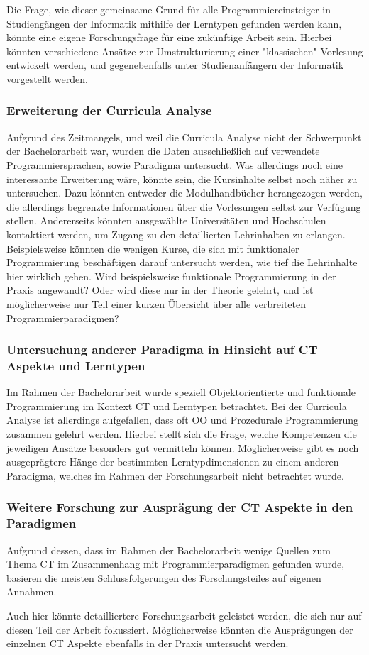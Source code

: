 Die Frage, wie dieser gemeinsame Grund für alle Programmiereinsteiger in Studiengängen der Informatik mithilfe der Lerntypen gefunden werden kann, könnte eine eigene Forschungsfrage für eine zukünftige Arbeit sein. Hierbei könnten verschiedene Ansätze zur Umstrukturierung einer "klassischen" Vorlesung entwickelt werden, und gegenebenfalls unter Studienanfängern der Informatik vorgestellt werden.

\subsubsection{Erweiterung der Curricula Analyse}
Aufgrund des Zeitmangels, und weil die Curricula Analyse nicht der Schwerpunkt der Bachelorarbeit war, wurden die Daten ausschließlich auf verwendete Programmiersprachen, sowie Paradigma untersucht. Was allerdings noch eine interessante Erweiterung wäre, könnte sein, die Kursinhalte selbst noch näher zu untersuchen. Dazu könnten entweder die Modulhandbücher herangezogen werden, die allerdings begrenzte Informationen über die Vorlesungen selbst zur Verfügung stellen. Andererseits könnten ausgewählte Universitäten und Hochschulen kontaktiert werden, um Zugang zu den detaillierten Lehrinhalten zu erlangen.
Beispielsweise könnten die wenigen Kurse, die sich mit funktionaler Programmierung beschäftigen darauf untersucht werden, wie tief die Lehrinhalte hier wirklich gehen. Wird beispielsweise funktionale Programmierung in der Praxis angewandt? Oder wird diese nur in der Theorie gelehrt, und ist möglicherweise nur Teil einer kurzen Übersicht über alle verbreiteten Programmierparadigmen?

\subsubsection{Untersuchung anderer Paradigma in Hinsicht auf CT Aspekte und Lerntypen}
Im Rahmen der Bachelorarbeit wurde speziell Objektorientierte und funktionale Programmierung im Kontext CT und Lerntypen betrachtet. Bei der Curricula Analyse ist allerdings aufgefallen, dass oft OO und Prozedurale Programmierung zusammen gelehrt werden. Hierbei stellt sich die Frage, welche Kompetenzen die jeweiligen Ansätze besonders gut vermitteln können.
Möglicherweise gibt es noch ausgeprägtere Hänge der bestimmten Lerntypdimensionen zu einem anderen Paradigma, welches im Rahmen der Forschungsarbeit nicht betrachtet wurde.

\subsubsection{Weitere Forschung zur Ausprägung der CT Aspekte in den Paradigmen}
Aufgrund dessen, dass im Rahmen der Bachelorarbeit wenige Quellen zum Thema CT im Zusammenhang mit Programmierparadigmen gefunden wurde, basieren die meisten Schlussfolgerungen des Forschungsteiles auf eigenen Annahmen.

Auch hier könnte detailliertere Forschungsarbeit geleistet werden, die sich nur auf diesen Teil der Arbeit fokussiert. Möglicherweise könnten die Ausprägungen der einzelnen CT Aspekte ebenfalls in der Praxis untersucht werden.


